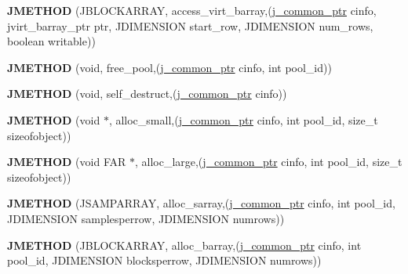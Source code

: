 \begin{DoxyCompactItemize}
{\bfseries J\+M\+E\+T\+H\+OD} (J\+B\+L\+O\+C\+K\+A\+R\+R\+AY, access\+\_\+virt\+\_\+barray,(\hyperlink{structjpeg__common__struct}{j\+\_\+common\+\_\+ptr} cinfo, jvirt\+\_\+barray\+\_\+ptr ptr, J\+D\+I\+M\+E\+N\+S\+I\+ON start\+\_\+row, J\+D\+I\+M\+E\+N\+S\+I\+ON num\+\_\+rows, boolean writable))
\item 
\mbox{\label{structjpeg__memory__mgr_a7e7e063767441999982d22c5cc0e9423}} 
{\bfseries J\+M\+E\+T\+H\+OD} (void, free\+\_\+pool,(\hyperlink{structjpeg__common__struct}{j\+\_\+common\+\_\+ptr} cinfo, int pool\+\_\+id))
\item 
\mbox{\label{structjpeg__memory__mgr_ae80ddea0ba4f845f91d3a30e350b5f44}} 
{\bfseries J\+M\+E\+T\+H\+OD} (void, self\+\_\+destruct,(\hyperlink{structjpeg__common__struct}{j\+\_\+common\+\_\+ptr} cinfo))
\item 
\mbox{\label{structjpeg__memory__mgr_a9372ad24444dda23175cc9203105911c}} 
{\bfseries J\+M\+E\+T\+H\+OD} (void $\ast$, alloc\+\_\+small,(\hyperlink{structjpeg__common__struct}{j\+\_\+common\+\_\+ptr} cinfo, int pool\+\_\+id, size\+\_\+t sizeofobject))
\item 
\mbox{\label{structjpeg__memory__mgr_a130f6dbc700cc045bdbe35beff2cb326}} 
{\bfseries J\+M\+E\+T\+H\+OD} (void F\+AR $\ast$, alloc\+\_\+large,(\hyperlink{structjpeg__common__struct}{j\+\_\+common\+\_\+ptr} cinfo, int pool\+\_\+id, size\+\_\+t sizeofobject))
\item 
\mbox{\label{structjpeg__memory__mgr_a3fdd2e1dfdc089fd61f17b608c0263f2}} 
{\bfseries J\+M\+E\+T\+H\+OD} (J\+S\+A\+M\+P\+A\+R\+R\+AY, alloc\+\_\+sarray,(\hyperlink{structjpeg__common__struct}{j\+\_\+common\+\_\+ptr} cinfo, int pool\+\_\+id, J\+D\+I\+M\+E\+N\+S\+I\+ON samplesperrow, J\+D\+I\+M\+E\+N\+S\+I\+ON numrows))
\item 
\mbox{\label{structjpeg__memory__mgr_aefc8abe884dab5648c1e4e7ada2e2e18}} 
{\bfseries J\+M\+E\+T\+H\+OD} (J\+B\+L\+O\+C\+K\+A\+R\+R\+AY, alloc\+\_\+barray,(\hyperlink{structjpeg__common__struct}{j\+\_\+common\+\_\+ptr} cinfo, int pool\+\_\+id, J\+D\+I\+M\+E\+N\+S\+I\+ON blocksperrow, J\+D\+I\+M\+E\+N\+S\+I\+ON numrows))
\item 

\end{DoxyCompactItemize}
